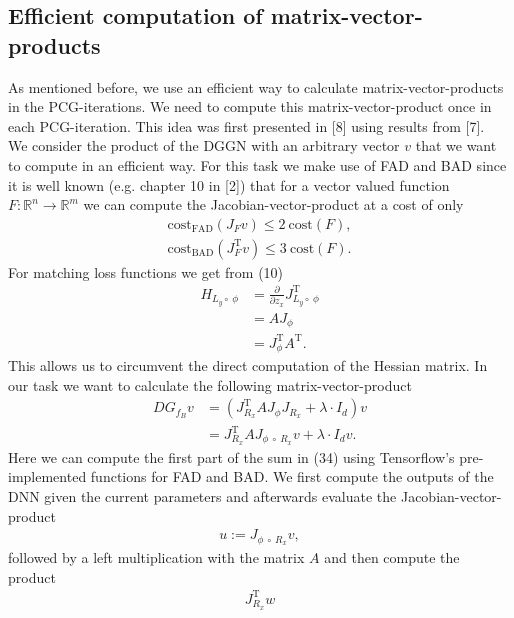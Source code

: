 \documentclass[conference]{IEEEtran}
\begin{document}
\subsection{Efficient computation of matrix-vector-products}
\noindent
As mentioned before, we use an efficient way to calculate matrix-vector-products in the PCG-iterations. We need to compute this matrix-vector-product once in each PCG-iteration. This idea was first presented in [8] using results from [7].\\
We consider the product of the DGGN with an arbitrary vector $v$ that we want to compute in an efficient way.
For this task we make use of FAD and BAD since it is well known (e.g. chapter 10 in [2]) that for a vector valued function $F:\mathbb{R}^{n}\rightarrow\mathbb{R}^{m}$ we can compute the Jacobian-vector-product at a cost of only
\begin{align}
	\mathrm{cost}_{\text{FAD}}(J_{F}v)\leq 2\:\mathrm{cost}(F),\\
	\mathrm{cost}_{\text{BAD}}(J_{F}^{\mathrm{T}}v)\leq 3\:\mathrm{cost}(F).
\end{align}
For matching loss functions we get from (10)
\begin{align}
	H_{L_{y}\circ\:\phi} &= \frac{\partial}{\partial z_{x}}J_{L_{y}\circ\:\phi}^{\mathrm{T}}\\
	&= AJ_{\phi} \\
	&= J_{\phi}^{\mathrm{T}}A^{\mathrm{T}}.
\end{align}
This allows us to circumvent the direct computation of the Hessian matrix. In our task we want
to calculate the following matrix-vector-product
\begin{align}
	DG_{f_{B}}v &=  \left(J_{R_{x}}^{\mathrm{T}}AJ_{\phi}J_{R_{x}} + \lambda\cdot I_{d}\right)v\\
	&= J_{R_{x}}^{\mathrm{T}}AJ_{\phi\:\circ\: R _{x}}v + \lambda\cdot I_{d}v.
\end{align}
Here we can compute the first part of the sum in (34) using Tensorflow's pre-implemented functions for FAD and BAD. We first compute the outputs of the DNN given the current parameters and afterwards evaluate the Jacobian-vector-product
\begin{align}
	u := J_{\phi\:\circ\: R _{x}}v,
\end{align}
followed by a left multiplication with the matrix $A$ and then compute the product
\begin{align}
	J_{R_{x}}^{\mathrm{T}}w
\end{align}
\end{document}
